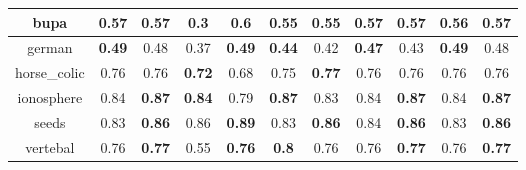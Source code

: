 \documentclass{article}%
\begin{document}
\begin{tabular}{c|cccccccccc}
\hline%
bupa&0.57&0.57&0.3&\textbf{0.6}&0.55&0.55&0.57&0.57&0.56&\textbf{0.57}\\%
\hline%
german&\textbf{0.49}&0.48&0.37&\textbf{0.49}&\textbf{0.44}&0.42&\textbf{0.47}&0.43&\textbf{0.49}&0.48\\%
\hline%
horse\_colic&0.76&0.76&\textbf{0.72}&0.68&0.75&\textbf{0.77}&0.76&0.76&0.76&0.76\\%
\hline%
ionosphere&0.84&\textbf{0.87}&\textbf{0.84}&0.79&\textbf{0.87}&0.83&0.84&\textbf{0.87}&0.84&\textbf{0.87}\\%
\hline%
seeds&0.83&\textbf{0.86}&0.86&\textbf{0.89}&0.83&\textbf{0.86}&0.84&\textbf{0.86}&0.83&\textbf{0.86}\\%
\hline%
vertebal&0.76&\textbf{0.77}&0.55&\textbf{0.76}&\textbf{0.8}&0.76&0.76&\textbf{0.77}&0.76&\textbf{0.77}\\%
\hline%
\end{tabular}

%
\end{document}
